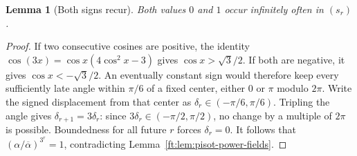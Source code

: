 \documentclass[11pt,a4paper]{article}
\newtheorem{lemma}[theorem]{Lemma}
\theoremstyle{definition}
\theoremstyle{remark}
\numberwithin{equation}{section}
\begin{document}
\begin{lemma}[Both signs recur]
\label{ft:lem:cubic-both-signs}
Both values $0$ and $1$ occur infinitely often in $(s_r)$.
\end{lemma}
\begin{proof}
If two consecutive cosines are positive, the identity
$\cos(3x)=\cos x(4\cos^2x-3)$ gives $\cos x>\sqrt3/2$.
If both are negative, it gives $\cos x<-\sqrt3/2$.
An eventually constant sign would therefore keep every sufficiently
late angle within $\pi/6$ of a fixed center, either $0$ or $\pi$
modulo $2\pi$. Write the signed displacement from that center as
$\delta_r\in(-\pi/6,\pi/6)$. Tripling the angle gives
$\delta_{r+1}=3\delta_r$: since $3\delta_r\in(-\pi/2,\pi/2)$,
no change by a multiple of $2\pi$ is possible. Boundedness for all
future $r$ forces $\delta_r=0$. It follows that
$(\alpha/\overline\alpha)^{3^r}=1$, contradicting
Lemma~\ref{ft:lem:pisot-power-fields}.
\end{proof}
\end{document}
